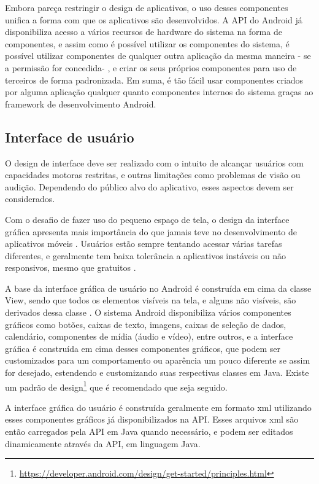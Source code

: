 Embora pareça restringir o design de aplicativos, o uso desses componentes unifica a forma com que os aplicativos são desenvolvidos. A API do Android já disponibiliza acesso a vários recursos de hardware do sistema na forma de componentes, e assim como é possível utilizar os componentes do sistema, é possível utilizar componentes de qualquer outra aplicação da mesma maneira - se a permissão for concedida- , e criar os seus próprios componentes para uso de terceiros de forma padronizada. Em suma, é tão fácil usar componentes criados por alguma aplicação qualquer quanto componentes internos do sistema graças ao framework de desenvolvimento Android.

\subsection{Interface de usuário}

O design de interface deve ser realizado com o intuito de alcançar usuários com capacidades motoras restritas, e outras limitações como problemas de visão ou audição. Dependendo do público alvo do aplicativo, esses aspectos devem ser considerados.

Com o desafio de fazer uso do pequeno espaço de tela, o design da interface gráfica apresenta mais importância do que jamais teve no desenvolvimento de aplicativos móveis \cite{eswissues}. Usuários estão sempre tentando acessar várias tarefas diferentes, e geralmente tem baixa tolerância a aplicativos instáveis ou não responsivos, mesmo que gratuitos \cite{eswmobile}. 

A base da interface gráfica de usuário no Android é construída em cima da classe View, sendo que todos os elementos visíveis na tela, e alguns não visíveis, são derivados dessa classe \cite{androidarch2010}. O sistema Android disponibiliza vários componentes gráficos como botões, caixas de texto, imagens, caixas de seleção de dados, calendário, componentes de mídia (áudio e vídeo), entre outros, e a interface gráfica é construída em cima desses componentes gráficos, que podem ser customizados para um comportamento ou aparência um pouco diferente se assim for desejado, estendendo e customizando suas respectivas classes em Java. Existe um padrão de design\footnote{\url{https://developer.android.com/design/get-started/principles.html}} que é recomendado que seja seguido.

A interface gráfica do usuário é construída geralmente em formato xml utilizando esses componentes gráficos já disponibilizados na API. Esses arquivos xml são então carregados pela API em Java quando necessário, e podem ser editados dinamicamente através da API, em linguagem Java.

